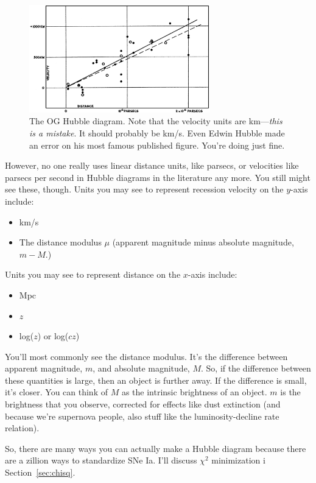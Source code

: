\begin{figure}[h!]
    \centering
    \includegraphics[width=0.7\textwidth]{figs/hubble_diagram_og.jpeg}
    \caption{The OG Hubble diagram. Note that the velocity units are km---\textit{this is a mistake}. It should probably be km/s. Even Edwin Hubble made an error on his most famous published figure. You're doing just fine.}
    \label{fig:oghubble}
\end{figure}

However, no one really uses linear distance units, like parsecs, or velocities like parsecs per second in Hubble diagrams in the literature any more. You still might see these, though. Units you may see to represent recession velocity on the $y$-axis include:
\begin{itemize}
    \item km/s
    \item The distance modulus $\mu$ (apparent magnitude minus absolute magnitude, $m-M$.)
\end{itemize}
Units you may see to represent distance on the $x$-axis include:
\begin{itemize}
    \item Mpc
    \item $z$
    \item log($z$) or log($cz$)
\end{itemize}
You'll most commonly see the distance modulus. It's the difference between apparent magnitude, $m$, and absolute magnitude, $M$. So, if the difference between these quantities is large, then an object is further away. If the difference is small, it's closer. You can think of $M$ as the intrinsic brightness of an object. $m$ is the brightness that you observe, corrected for effects like dust extinction (and because we're supernova people, also stuff like the luminosity-decline rate relation). 

So, there are many ways you can actually make a Hubble diagram because there are a zillion ways to standardize SNe Ia. I'll discuss $\chi^{2}$ minimization i Section~\ref{sec:chisq}. 

